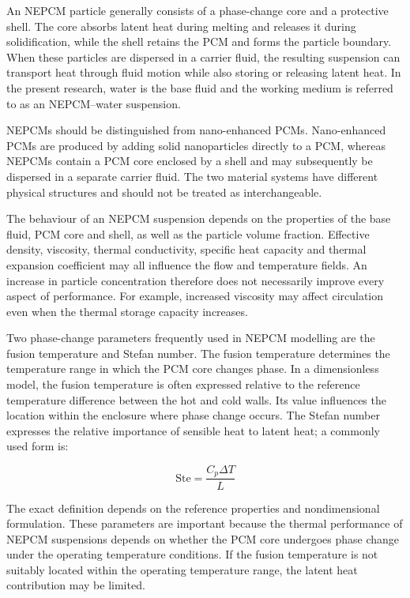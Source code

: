 An NEPCM particle generally consists of a phase-change core and a protective shell. The core absorbs latent heat during melting and releases it during solidification, while the shell retains the PCM and forms the particle boundary. When these particles are dispersed in a carrier fluid, the resulting suspension can transport heat through fluid motion while also storing or releasing latent heat. In the present research, water is the base fluid and the working medium is referred to as an NEPCM--water suspension.

NEPCMs should be distinguished from nano-enhanced PCMs. Nano-enhanced PCMs are produced by adding solid nanoparticles directly to a PCM, whereas NEPCMs contain a PCM core enclosed by a shell and may subsequently be dispersed in a separate carrier fluid. The two material systems have different physical structures and should not be treated as interchangeable.

The behaviour of an NEPCM suspension depends on the properties of the base fluid, PCM core and shell, as well as the particle volume fraction. Effective density, viscosity, thermal conductivity, specific heat capacity and thermal expansion coefficient may all influence the flow and temperature fields. An increase in particle concentration therefore does not necessarily improve every aspect of performance. For example, increased viscosity may affect circulation even when the thermal storage capacity increases.

Two phase-change parameters frequently used in NEPCM modelling are the fusion temperature and Stefan number. The fusion temperature determines the temperature range in which the PCM core changes phase. In a dimensionless model, the fusion temperature is often expressed relative to the reference temperature difference between the hot and cold walls. Its value influences the location within the enclosure where phase change occurs. The Stefan number expresses the relative importance of sensible heat to latent heat; a commonly used form is:

\begin{equation}
    \mathrm{Ste} = \frac{C_p \Delta T}{L}
\end{equation}

The exact definition depends on the reference properties and nondimensional formulation. These parameters are important because the thermal performance of NEPCM suspensions depends on whether the PCM core undergoes phase change under the operating temperature conditions. If the fusion temperature is not suitably located within the operating temperature range, the latent heat contribution may be limited.

